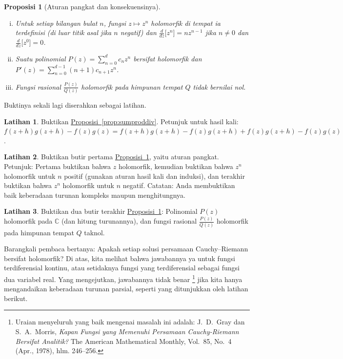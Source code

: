 \documentclass[12pt,openany]{book}
\newcommand{\C}{{\mathbb{C}}}
\theoremstyle{plain}
\newtheorem{prop}[thm]{Proposisi}
\theoremstyle{remark}
\theoremstyle{definition}
\newenvironment{exbox}{%
    \def\FrameCommand{\vrule width 1pt \relax\hspace{10pt}}%
    \MakeFramed{\advance\hsize-\width\FrameRestore}%
}{%
    \endMakeFramed
}
\theoremstyle{exercise}
\newtheorem{exercise}{Latihan}[section]
\theoremstyle{example}
\newcommand{\propref}[1]{\hyperref[#1]{Proposisi~\ref*{#1}}}
\begin{document}
\begin{prop}[Aturan pangkat dan konsekuensinya] \label{prop:powerrule}
\leavevmode
\begin{enumerate}[(i)]
\item Untuk setiap bilangan bulat $n$, fungsi $z \mapsto z^n$ holomorfik
di tempat ia terdefinisi (di luar titik asal jika $n$ negatif) dan
$\frac{d}{dz}\bigl[ z^n \bigr] = n z^{n-1}$
jika $n \neq 0$ dan $\frac{d}{dz}\bigl[ z^0 \bigr] = 0$.
\item
Suatu polinomial $P(z) = \sum_{n=0}^d c_n z^n$ bersifat
holomorfik dan
$P'(z) = \sum_{n=0}^{d-1} (n+1) c_{n+1} z^n$.
\item Fungsi rasional $\frac{P(z)}{Q(z)}$
holomorfik pada himpunan tempat $Q$ tidak bernilai nol.
\end{enumerate}
\end{prop}

Buktinya sekali lagi diserahkan sebagai latihan.

\begin{exbox}
\begin{exercise}
Buktikan \propref{prop:sumproddiv}.
Petunjuk untuk hasil kali:
$f(z+h)g(z+h) - f(z)g(z) =
f(z+h)g(z+h) - f(z)g(z+h) +
f(z)g(z+h) - f(z)g(z)$.
\end{exercise}

\begin{exercise}
Buktikan butir pertama \propref{prop:powerrule}, yaitu aturan pangkat.
Petunjuk: Pertama buktikan bahwa $z$ holomorfik,
kemudian buktikan bahwa $z^n$ holomorfik untuk $n$ positif (gunakan aturan hasil kali dan
induksi), dan terakhir buktikan
bahwa $z^n$ holomorfik untuk $n$ negatif.
Catatan: Anda membuktikan baik keberadaan turunan kompleks maupun
menghitungnya.
\end{exercise}

\begin{exercise}
Buktikan dua butir terakhir \propref{prop:powerrule}:
Polinomial $P(z)$ holomorfik pada $\C$ (dan hitung turunannya),
dan fungsi rasional
$\frac{P(z)}{Q(z)}$ holomorfik pada himpunan tempat $Q$ taknol.
\end{exercise}
\end{exbox}

Barangkali pembaca bertanya:
Apakah setiap solusi
persamaan Cauchy--Riemann bersifat holomorfik?  Di atas, kita melihat bahwa jawabannya
ya untuk fungsi terdiferensial kontinu, atau setidaknya
fungsi yang terdiferensial sebagai fungsi dua variabel real.
Yang mengejutkan, jawabannya tidak benar%
\footnote{%
Uraian menyeluruh yang baik mengenai masalah ini adalah:
J.\ D.\ Gray dan S.\ A.\ Morris,
\emph{Kapan Fungsi yang Memenuhi Persamaan Cauchy-Riemann
Bersifat Analitik?}  The American Mathematical Monthly, Vol.\ 85, No.\ 4 (Apr.,
1978), hlm. 246--256.} jika kita hanya mengandaikan keberadaan turunan parsial,
seperti yang ditunjukkan oleh latihan berikut.
\end{document}
